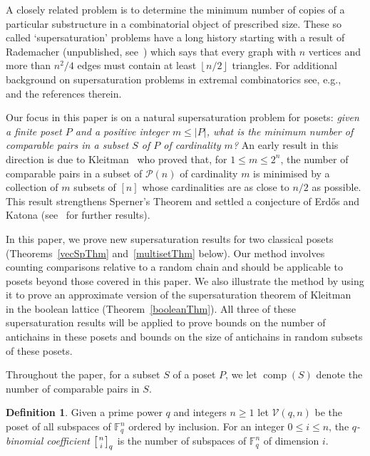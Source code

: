 \documentclass[11 pt]{article}
\theoremstyle{definition}
\newtheorem{defn}[equation]{Definition}
\theoremstyle{case}
\numberwithin{equation}{section}
\DeclareMathOperator{\comp}{comp}
\newcommand{\qbinom}[3]{\left[\genfrac{}{}{0pt}{}{#1}{#2}\right]_{#3}}
\newcommand{\Vectors}[2]{\mathcal{V}\left(#1,#2\right)}
\begin{document}
A closely related problem is to determine the minimum number of copies of a particular substructure in a combinatorial object of prescribed size. These so called `supersaturation' problems have a long history starting with a result of Rademacher (unpublished, see~\cite{Rademacher}) which says  that every graph with $n$ vertices and more than $n^2/4$ edges must contain at least $\left\lfloor n/2\right\rfloor$ triangles. For additional background on supersaturation problems in extremal combinatorics see, e.g.,~\cite{Reiher,Patkos,additive, DGS2, SS2} and the references therein.

Our focus in this paper is on a natural supersaturation problem for posets: \emph{given a finite poset $P$ and a positive integer $m\leq |P|$, what is the minimum number of comparable pairs in a subset $S$ of $P$ of cardinality $m$?}  An early result in this direction is due to Kleitman~\cite{superKleitman} who proved that, for $1\leq m\leq 2^n$, the number of comparable pairs in a subset of $\mathcal{P}(n)$ of cardinality $m$ is minimised by a collection of $m$ subsets of $[n]$ whose cardinalities are as close to $n/2$ as possible. This result strengthens Sperner's Theorem and settled a conjecture of Erd\H{o}s and Katona (see~\cite{DGKS,DGS, BaloghWagnerKleitman} for further results). 

In this paper, we prove new supersaturation results for two classical posets (Theorems~\ref{vecSpThm} and~\ref{multisetThm} below). Our method involves counting comparisons relative to a random chain and should be applicable to posets beyond those covered in this paper. We also illustrate the method by using it to prove an approximate version of the supersaturation theorem of Kleitman~\cite{superKleitman} in the boolean lattice (Theorem~\ref{booleanThm}). All three of these supersaturation results will be applied to prove bounds on the number of antichains in these posets and bounds on the size of antichains in random subsets of these posets.

Throughout the paper, for a subset $S$ of a poset $P$, we let $\comp(S)$ denote the number of comparable pairs in $S$.


\begin{defn}
Given a prime power $q$ and integers $n \geq 1$  let $\Vectors{q}{n}$ be the poset of all subspaces of $\mathbb{F}_q^n$ ordered by inclusion. 
For an integer $0\leq i\leq n$, the \emph{$q$-binomial coefficient} $\qbinom{n}{i}{q}$ is the number of subspaces of $\mathbb{F}_q^n$ of dimension $i$.
\end{defn}
\end{document}
